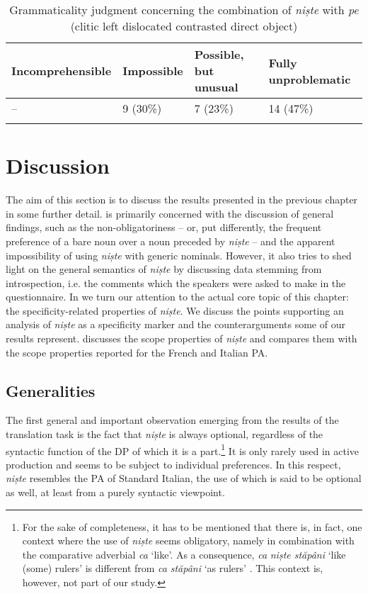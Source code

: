 \documentclass[output=paper,colorlinks,citecolor=brown]{langscibook}
\begin{document}
\begin{table}
\begin{tabularx}{\textwidth}{XXXX}
\lsptoprule
Incomprehensible & Impossible & Possible, \linebreak but unusual & Fully \linebreak \mbox{unproblematic}\\
\midrule
-- & 9 (30\%) & 7 (23\%) & 14 (47\%)\\
\lspbottomrule
\end{tabularx}
\caption{Grammaticality judgment concerning the combination of \textit{niște} with \textit{pe} (clitic left dislocated contrasted direct object)}
\label{tab:ds11}
\end{table}

\section{Discussion}\label{sec:ds5}

The aim of this section is to discuss the results presented in the previous chapter in some further detail.  is primarily concerned with the discussion of general findings, such as the non-obligatoriness – or, put differently, the frequent preference of a bare noun over a noun preceded by \textit{niște} – and the apparent impossibility of using \textit{niște} with generic nominals. However, it also tries to shed light on the general semantics of \textit{niște} by discussing data stemming from introspection, i.e. the comments which the speakers were asked to make in the questionnaire. In  we turn our attention to the actual core topic of this chapter: the specificity-related properties of \textit{niște}. We discuss the points supporting an analysis of \textit{niște} as a specificity marker and the counterarguments some of our results represent.  discusses the scope properties of \textit{niște} and compares them with the scope properties reported for the French and Italian PA. 


\subsection{Generalities}\label{sec:ds5.1}
The first general and important observation emerging from the results of the translation task is the fact that \textit{niște} is always optional, regardless of the syntactic function of the DP of which it is a part.\footnote{For the sake of completeness, it has to be mentioned that there is, in fact, one context where the use of \textit{niște} seems obligatory, namely in combination with the comparative adverbial \textit{ca} ‘like’. As a consequence, \textit{ca} \textit{niște st\u{a}pâni} ‘like (some) rulers’ is different from \textit{ca} \textit{st\u{a}pâni} ‘as rulers’ \citep[cf.][82]{Avram1986}. This context is, however, not part of our study.} It is only rarely used in active production and seems to be subject to individual preferences. In this respect, \textit{niște} resembles the PA of Standard Italian, the use of which is said to be optional as well, at least from a purely syntactic viewpoint.
\end{document}
